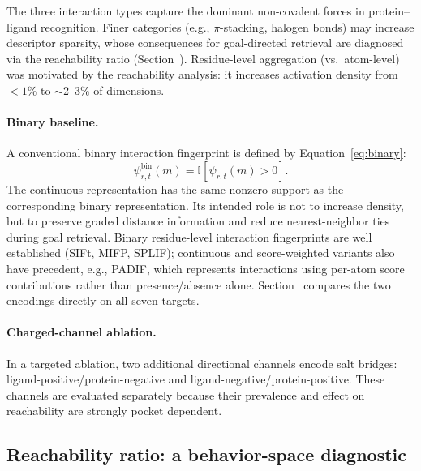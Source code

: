 \documentclass[journal=jcisd8,manuscript=article]{achemso}
\begin{document}
The three interaction types capture the dominant non-covalent forces in protein--ligand recognition. Finer categories (e.g., $\pi$-stacking, halogen bonds) may increase descriptor sparsity, whose consequences for goal-directed retrieval are diagnosed via the reachability ratio (Section~). Residue-level aggregation (vs.\ atom-level) was motivated by the reachability analysis: it increases activation density from $<1\%$ to $\sim$2--3\% of dimensions.

\paragraph{Binary baseline.} A conventional binary interaction fingerprint is defined by Equation~\ref{eq:binary}:
\begin{equation}
    \psi^{\mathrm{bin}}_{r,t}(m) = \mathbb{I}\left[\psi_{r,t}(m) > 0\right].
\label{eq:binary}
\end{equation}
The continuous representation has the same nonzero support as the corresponding binary representation. Its intended role is not to increase density, but to preserve graded distance information and reduce nearest-neighbor ties during goal retrieval. Binary residue-level interaction fingerprints are well established (SIFt, MIFP, SPLIF)\cite{deng2004sift,marcou2007mifp,da2014splif}; continuous and score-weighted variants also have precedent, e.g., PADIF, which represents interactions using per-atom score contributions rather than presence/absence alone.\cite{jasper2018padif} Section~ compares the two encodings directly on all seven targets.

\paragraph{Charged-channel ablation.} In a targeted ablation, two additional directional channels encode salt bridges: ligand-positive/protein-negative and ligand-negative/protein-positive. These channels are evaluated separately because their prevalence and effect on reachability are strongly pocket dependent.

\subsection{Reachability ratio: a behavior-space diagnostic}
\label{sec:reachability}
\end{document}
